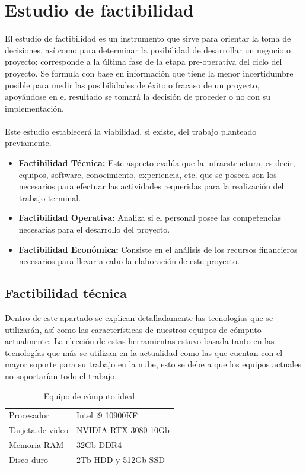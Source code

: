 \documentclass[12pt, a4paper, titlepage]{report}
\begin{document}
    	\section{Estudio de factibilidad}
    	El estudio de factibilidad es un instrumento que sirve para orientar la toma de decisiones, así como para determinar la posibilidad de desarrollar un negocio o proyecto; corresponde a la última fase de la etapa pre-operativa del ciclo del proyecto. Se formula con base en información que tiene la menor incertidumbre posible para medir las posibilidades de éxito o fracaso de un proyecto, apoyándose en el resultado se tomará la decisión de proceder o no con su implementación.\\\\ 
    	Este estudio establecerá la viabilidad, si existe, del trabajo planteado previamente.
    	\begin{itemize}
    		\item \textbf{Factibilidad Técnica:} Este aspecto evalúa que la infraestructura, es decir, equipos, software, conocimiento, experiencia, etc. que se poseen son los necesarios para efectuar las actividades requeridas para la realización del trabajo terminal.
    		\item \textbf{Factibilidad Operativa:} Analiza si el personal posee las competencias necesarias para el desarrollo del proyecto.
    		\item \textbf{Factibilidad Económica:} Consiste en el análisis de los recursos financieros necesarios para llevar a cabo la elaboración de este proyecto.
    	\end{itemize}
    	\subsection{Factibilidad técnica}
    	
    	Dentro de este apartado se explican detalladamente las tecnologías que se utilizarán, así como las características de nuestros equipos de cómputo actualmente. La elección de estas herramientas estuvo basada tanto en las tecnologías que más se utilizan en la actualidad como las que cuentan con el mayor soporte para su trabajo en la nube, esto se debe a que los equipos actuales no soportarían todo el trabajo.
    	    	
    	\begin{table}[H]
    		\caption[Equipo de cómputo ideal]{Equipo de cómputo ideal}
    		\begin{tabular}{|p{3.5cm}||p{10cm}|}
    			\rowcolor{guindapoli}
    			\multicolumn{2}{|c|}{\textbf{\textcolor{white}{Equipo de cómputo ideal.}}}\\
    			\hline
    			\rowcolor{azulclaro}Procesador & Intel i9 10900KF\\
    			\hline
    			\rowcolor{white}Tarjeta de video & NVIDIA RTX 3080 10Gb\\
    			\hline
    			\rowcolor{azulclaro}Memoria RAM & 32Gb DDR4\\
    			\hline
    			\rowcolor{white}Disco duro & 2Tb HDD y 512Gb SSD\\
    			\hline
    		\end{tabular}
    	\end{table}
    	
\end{document}
